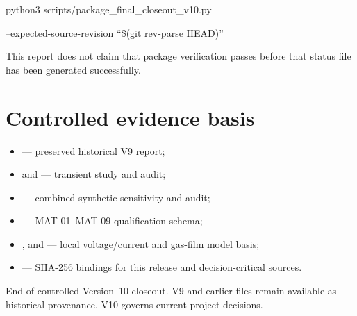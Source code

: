 \documentclass[10pt,a4paper]{article}
\newcommand{\sans}{\fontfamily{qhv}\selectfont}
\begin{document}
\begin{plainbox}
{\small\ttfamily python3 scripts/package\_final\_closeout\_v10.py\par
\hspace*{5mm}--expected-source-revision ``\$(git rev-parse HEAD)''}
\end{plainbox}

This report does not claim that package verification passes before that status
file has been generated successfully.

\section{Controlled evidence basis}

\begin{itemize}
  \item {} --- preserved historical V9 report;
  \item {} and
   --- transient study and audit;
  \item {} --- combined
  synthetic sensitivity and audit;
  \item {}
  --- MAT-01--MAT-09 qualification schema;
  \item {},
   and
   ---
  local voltage/current and gas-film model basis;
  \item {}
  --- SHA-256 bindings for this release and decision-critical sources.
\end{itemize}

\vfill
{\sans\scriptsize\color{Slate}End of controlled Version~10 closeout. V9 and
earlier files remain available as historical provenance. V10 governs current
project decisions.}
\end{document}
